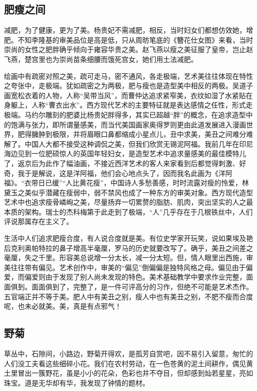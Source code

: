 \documentclass{article}
\begin{document}
\subsection{肥瘦之间}
减肥，为了健康，更为了美。杨贵妃不需减肥，相反，当时妇女们都想仿效她，增肥。不知李隆基的审美品位是高是低，只从周昉笔底的《簪花仕女图》来看，当时崇尚的女性之肥胖确乎倾向于雍容华贵之美。赵飞燕以瘦之美征服了皇帝，岂止赵飞燕，楚宫里也为崇尚苗条细腰而饿死宫女，她们用土法减肥。

绘画中有疏密对照之美，疏可走马，密不通风，各走极端，艺术美往往体现在特性之夸张中，走极端。犹如疏密之为两极，肥与瘦也是造型美中相反的两极。吴道子画宽松衣着的人物，人称“吴带当风”，而曹仲达追求紧窄美，衣纹如湿了水紧贴在身躯上，人称“曹衣出水”。西方现代艺术的主要特征就是表达感情之任性，形式走极端。马约尔雕刻的肥婆比杨贵妃胖得多，其实已超越“胖”的概念，在追求造型中的饱满与张力，即所谓量感美，而当代美国画家奥得罗则更由此道发展进入漫画世界，肥得臃肿到极限，并将眉眼口鼻都缩成小星点儿，丑中求美，美丑之间难分难解了。中国人大都不接受这种调侃之美，但我们欣赏无锡泥阿福。我前几年在印尼海边见到一位肥硕惊人的英国年轻妇女，是造型艺术中追求量感美的最佳模特儿了，返京后为此作了幅油画，不接近西洋艺术的客人来家看到后都觉得刺激、好奇，我于是解说，这是洋阿福，他们会心地点头了，因而我名此画为《洋阿福》。“衣带日已缓”“人比黄花瘦”，中国诗人多愁善感，时时流露对瘦的怜爱，林黛玉之美似乎潜藏在瘦弱中，弱不禁风也成了一种东方的审美对象。西方现代造型艺术中也追求瘦骨嶙峋之美，尽量扬弃一切累赘的脂肪、肌肉，突出坚实的人之最本质的架构。瑞士的杰科梅第于此走到了极端，“人”几乎存在于几根铁丝中，人们评说那属存在主义了。

生活中人们追求肥瘦合度，有人说合度就是美。有位史学家开玩笑，说如果埃及艳后克利奥帕特拉的鼻子增高半毫厘，罗马的历史就要改写了。确乎，美丑之间差之毫厘，失之千里。形容美总说增一分太长，减一分太短。但，情人眼里出西施，审美往往带有偏见。艺术创作中，审美的“偏见”倒偏偏是独特风格之母。偏见由于偏爱，而偏爱则由于发现了别人尚未发现的特色。美术基础教学中要求作业完整，面面俱到。面面俱到了，完整了，是一件可评高分的习作，但绝不可能是艺术杰作。五官端正并不等于美。肥人中有美丑之别，瘦人中也有美丑之别，不肥不瘦而合度呢，也未必就美。美，真是有点邪气！
\subsection{野菊}
草丛中，石隙间，小路边，野菊开得欢，是孤芳自赏吧，因不易引入留意，匆忙的人们没工夫看这些细碎小花。我们在农村劳动，在一色苍黄的泥土间耕作，偶见黄土里冒出一簇野花，虽是小小的花朵，色彩也并不夺目，但却感到灿若星星，亮如珠宝。道是无华却有华，我发现了钟情的题材。
\end{document}
